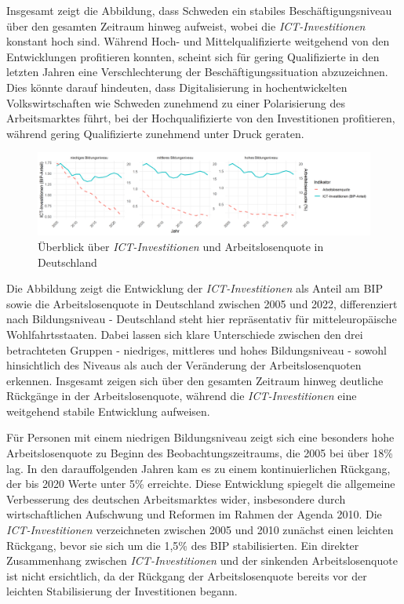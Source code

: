 Insgesamt zeigt die Abbildung, dass Schweden ein stabiles Beschäftigungsniveau über 
den gesamten Zeitraum hinweg aufweist, wobei die \textit{\ac{ICT}-Investitionen} 
konstant hoch sind. Während Hoch- und Mittelqualifizierte weitgehend von den 
Entwicklungen profitieren konnten, scheint sich für gering Qualifizierte in den 
letzten Jahren eine Verschlechterung der Beschäftigungssituation abzuzeichnen. Dies 
könnte darauf hindeuten, dass Digitalisierung in hochentwickelten Volkswirtschaften 
wie Schweden zunehmend zu einer Polarisierung des Arbeitsmarktes führt, bei der 
Hochqualifizierte von den Investitionen profitieren, während gering Qualifizierte 
zunehmend unter Druck geraten.

\begin{figure}[htbp]
    \centering
    \includegraphics[width=\textwidth]{assets/plot_germany.png}
    \caption{Überblick über \textit{\ac{ICT}-Investitionen} und Arbeitslosenquote in 
    Deutschland}
    \label{fig:germany}
\end{figure}

Die Abbildung zeigt die Entwicklung der \textit{\ac{ICT}-Investitionen} als Anteil 
am BIP sowie die Arbeitslosenquote in Deutschland zwischen 2005 und 2022, 
differenziert nach Bildungsniveau - Deutschland steht hier repräsentativ für 
mitteleuropäische Wohlfahrtsstaaten. Dabei lassen sich klare Unterschiede zwischen 
den drei betrachteten Gruppen - niedriges, mittleres und hohes Bildungsniveau - sowohl 
hinsichtlich des Niveaus als auch der Veränderung der Arbeitslosenquoten erkennen. 
Insgesamt zeigen sich über den gesamten Zeitraum hinweg deutliche Rückgänge in der 
Arbeitslosenquote, während die \textit{\ac{ICT}-Investitionen} eine weitgehend 
stabile Entwicklung aufweisen.

Für Personen mit einem niedrigen Bildungsniveau zeigt sich eine besonders hohe 
Arbeitslosenquote zu Beginn des Beobachtungszeitraums, die 2005 bei über 18\% lag. 
In den darauffolgenden Jahren kam es zu einem kontinuierlichen Rückgang, der bis 2020 
Werte unter 5\% erreichte. Diese Entwicklung spiegelt die allgemeine Verbesserung des 
deutschen Arbeitsmarktes wider, insbesondere durch wirtschaftlichen Aufschwung und 
Reformen im Rahmen der Agenda 2010. Die \textit{\ac{ICT}-Investitionen} verzeichneten 
zwischen 2005 und 2010 zunächst einen leichten Rückgang, bevor sie sich um die 1,5\% 
des BIP stabilisierten. Ein direkter Zusammenhang zwischen 
\textit{\ac{ICT}-Investitionen} und der sinkenden Arbeitslosenquote ist nicht 
ersichtlich, da der Rückgang der Arbeitslosenquote bereits vor der leichten 
Stabilisierung der Investitionen begann.

